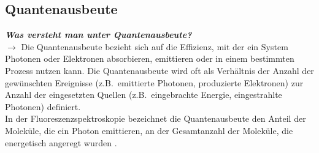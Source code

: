 \subsection{\label{subsec:FZV3}Quantenausbeute}
\textbf{\textit{Was versteht man unter Quantenausbeute?}} \\
$\rightarrow$
Die Quantenausbeute bezieht sich auf die Effizienz, mit der ein System Photonen oder Elektronen absorbieren,
emittieren oder in einem bestimmten Prozess nutzen kann.
Die Quantenausbeute wird oft als Verhältnis der Anzahl der gewünschten Ereignisse
(z.B.~emittierte Photonen, produzierte Elektronen) zur Anzahl der eingesetzten Quellen
(z.B.~eingebrachte Energie, eingestrahlte Photonen) definiert. \\
In der Fluoreszenzspektroskopie bezeichnet die Quantenausbeute den Anteil der Moleküle,
die ein Photon emittieren, an der Gesamtanzahl der Moleküle, die energetisch angeregt wurden \cite{Prinzip,Demtroder}. \\
